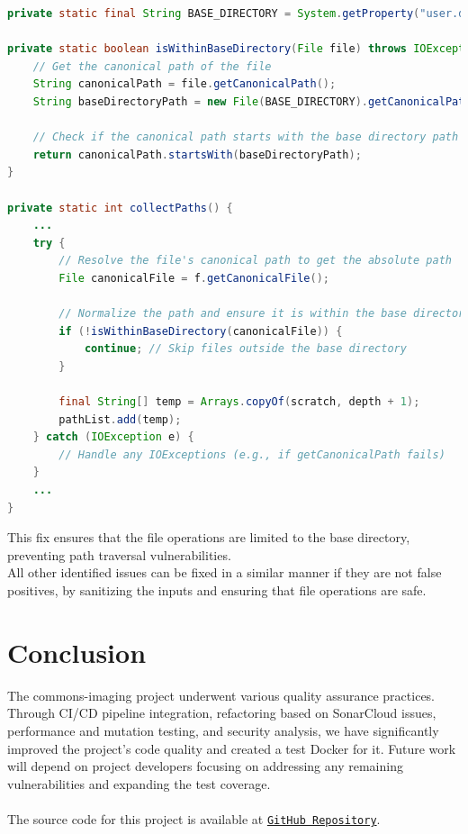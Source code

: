 \documentclass[a4paper,12pt]{report}
\begin{document}
\begin{lstlisting}[language=java, caption=SurveyTiffFolder.java:collectPath.class fix]
private static final String BASE_DIRECTORY = System.getProperty("user.dir");

private static boolean isWithinBaseDirectory(File file) throws IOException {
    // Get the canonical path of the file
    String canonicalPath = file.getCanonicalPath();
    String baseDirectoryPath = new File(BASE_DIRECTORY).getCanonicalPath();

    // Check if the canonical path starts with the base directory path
    return canonicalPath.startsWith(baseDirectoryPath);
}

private static int collectPaths() {
    ...
    try {
        // Resolve the file's canonical path to get the absolute path
        File canonicalFile = f.getCanonicalFile();

        // Normalize the path and ensure it is within the base directory
        if (!isWithinBaseDirectory(canonicalFile)) {
            continue; // Skip files outside the base directory
        }

        final String[] temp = Arrays.copyOf(scratch, depth + 1);
        pathList.add(temp);
    } catch (IOException e) {
        // Handle any IOExceptions (e.g., if getCanonicalPath fails)
    }
    ...
}
\end{lstlisting}

This fix ensures that the file operations are limited to the base directory, preventing path traversal vulnerabilities. 
\\
All other identified issues can be fixed in a similar manner if they are not false positives, by sanitizing the inputs and ensuring that file operations are safe.

\newpage


\chapter{Conclusion}
The commons-imaging project underwent various quality assurance practices. Through CI/CD pipeline integration, refactoring based on SonarCloud issues, performance and mutation testing, and security analysis, we have significantly improved the project’s code quality and created a test Docker for it. Future work will depend on project developers focusing on addressing any remaining vulnerabilities and expanding the test coverage.
\\ \\
The source code for this project is available at \href{https://github.com/nimamehranfar/commons-imaging}{\texttt{GitHub Repository}}.
\end{document}
